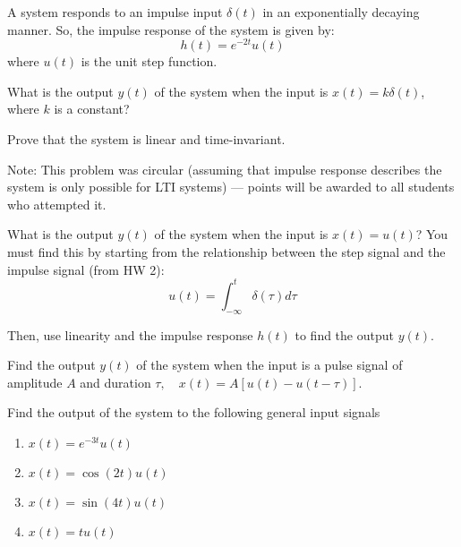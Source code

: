 \documentclass{ee102_pset}
\author{\rule{3cm}{0.4pt}} %
\begin{document}
A system responds to an impulse input $\delta(t)$ in an exponentially decaying manner. So, the impulse response of the system is given by:
\[
h(t) = e^{-2t}u(t)
\]
where $u(t)$ is the unit step function.

\problempart[10 points] What is the output $y(t)$ of the system when the input is $x(t) = k \delta(t)$, where $k$ is a constant?

\problempart[10 points] Prove that the system is linear and time-invariant. 

{\color{red} Note: This problem was circular (assuming that impulse response describes the system is only possible for LTI systems) --- points will be awarded to all students who attempted it.}

\problempart[15 points] What is the output $y(t)$ of the system when the input is $x(t) = u(t)$? You must find this by starting from the relationship between the step signal and the impulse signal (from HW 2): 
\[
u(t) = \int_{-\infty}^{t} \delta(\tau) d\tau
\]

Then, use linearity and the impulse response $h(t)$ to find the output $y(t)$.

\problempart[15 points] Find the output $y(t)$ of the system when the input is a pulse signal of amplitude $A$ and duration $\tau, \quad x(t) = A[u(t) - u(t-\tau)]$.

 Find the output of the system to the following general input signals
\begin{enumerate}
    \item $x(t) = e^{-3t}u(t)$
    \item $x(t) = \cos(2t)u(t)$
    \item $x(t) = \sin(4t)u(t)$
    \item $x(t) = t u(t)$
\end{enumerate}




\end{document}
